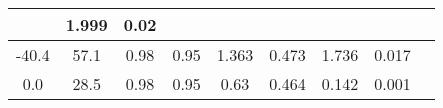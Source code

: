 \documentclass[a4paper,10pt]{article}
\begin{document}
\begin{longtable}{
     |
%    
    c|
%    
    c|
%    
    c|
%    
    c|
%    
    c|
%    
    c|
%    
    c|
%    
    c|
%    
    c|
%    
    }
%        
        & 1.999
%        

%        

%        
        & 0.02
%        

%        
        \\
        \hline

        

%        

%        
        -40.4
%        

%        

%        
        & 57.1
%        

%        

%        
        & 0.98
%        

%        

%        
        & 0.95
%        

%        

%        
        & 1.363
%        

%        

%        
        & 0.473
%        

%        

%        
        & 1.736
%        

%        

%        
        & 0.017
%        

%        
        \\
        \hline

        

%        

%        
        0.0
%        

%        

%        
        & 28.5
%        

%        

%        
        & 0.98
%        

%        

%        
        & 0.95
%        

%        

%        
        & 0.63
%        

%        

%        
        & 0.464
%        

%        

%        
        & 0.142
%        

%        

%        
        & 0.001
%        

%        
        \\
        \hline


\end{longtable}
\end{document}
